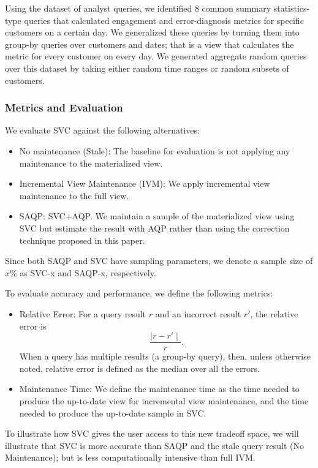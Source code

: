 Using the dataset of analyst queries, we identified 8 common summary statistics-type queries that calculated engagement and error-diagnosis metrics for specific customers on a certain day.
We generalized these queries by turning them into group-by queries over customers and dates; that is a view that calculates the metric for every customer on every day.
We generated aggregate random queries over this dataset by taking either random time ranges or random subsets of customers.

\subsubsection{Metrics and Evaluation}
We evaluate SVC against the following alternatives:
\begin{itemize}
\item No maintenance (Stale): The baseline for evaluation is not applying any maintenance to the materialized view.
\item Incremental View Maintenance (IVM): We apply incremental view maintenance to the full view.
\item SAQP: SVC+AQP. We maintain a sample of the materialized view using SVC but estimate the result with AQP rather than using 
the correction technique proposed in this paper.
\end{itemize}
Since both SAQP and SVC have sampling parameters, we denote a sample size of $x \% $ as SVC-x and SAQP-x, respectively. 

To evaluate accuracy and performance, we define the following metrics:
\begin{itemize}
\item Relative Error: For a query result $r$ and an incorrect result $r'$, the relative error is \[\frac{\mid r-r' \mid}{r}.\] 
When a query has multiple results (a group-by query), then, unless otherwise noted, relative error is defined as the median over all the errors.
\item Maintenance Time: We define the maintenance time as the time needed to produce the up-to-date view for incremental view maintenance, and the time needed to produce the up-to-date sample in SVC. 
\end{itemize}

To illustrate how SVC gives the user access to this new tradeoff space, we will illustrate that SVC is more accurate than SAQP and the stale query result (No Maintenance); but is less computationally intensive than full IVM. 

